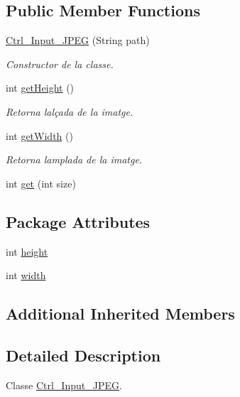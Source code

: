 \subsection*{Public Member Functions}
\begin{DoxyCompactItemize}
\item 
\hyperlink{classpersistencia_1_1input_1_1Ctrl__Input__JPEG_aa7d81dfa6240a7ee82e5188fc2600c58}{Ctrl\+\_\+\+Input\+\_\+\+J\+P\+EG} (String path)
\begin{DoxyCompactList}\small\item\em Constructor de la classe. \end{DoxyCompactList}\item 
int \hyperlink{classpersistencia_1_1input_1_1Ctrl__Input__JPEG_a173716ac8d17365965ede95f99a8e65a}{get\+Height} ()
\begin{DoxyCompactList}\small\item\em Retorna l\textquotesingle{}alçada de la imatge. \end{DoxyCompactList}\item 
int \hyperlink{classpersistencia_1_1input_1_1Ctrl__Input__JPEG_ab4cd4c26db5bd1ce89f6e53458c99ba8}{get\+Width} ()
\begin{DoxyCompactList}\small\item\em Retorna l\textquotesingle{}amplada de la imatge. \end{DoxyCompactList}\item 
int \hyperlink{classpersistencia_1_1input_1_1Ctrl__Input__JPEG_a702b13d096ba57f06b242987f0dbf4ec}{get} (int size)
\end{DoxyCompactItemize}
\subsection*{Package Attributes}
\begin{DoxyCompactItemize}
\item 
int \hyperlink{classpersistencia_1_1input_1_1Ctrl__Input__JPEG_a9e6805b998e58981f8cd7b8b6e609f27}{height}
\item 
int \hyperlink{classpersistencia_1_1input_1_1Ctrl__Input__JPEG_a07d902b25b54941dc0444398c7d380e7}{width}
\end{DoxyCompactItemize}
\subsection*{Additional Inherited Members}


\subsection{Detailed Description}
Classe \hyperlink{classpersistencia_1_1input_1_1Ctrl__Input__JPEG}{Ctrl\+\_\+\+Input\+\_\+\+J\+P\+EG}. 

